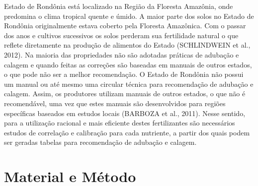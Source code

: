 \documentclass[article,12pt,onesidea,4paper,english,brazil]{abntex2}
\begin{document}
	Estado de Rondônia está localizado na Região da Floresta Amazônia, onde predomina o clima tropical quente e úmido. A maior parte dos solos no Estado de Rondônia originalmente estava coberto pela Floresta Amazônica. Com o passar dos anos e cultivos sucessivos os solos perderam sua fertilidade natural o que reflete diretamente na produção de alimentos do Estado (SCHLINDWEIN et al., 2012).
	Na maioria das propriedades não são adotadas práticas de adubação e calagem e quando feitas as correções são baseadas em manuais de outros estados, o que pode não ser a melhor recomendação. O Estado de Rondônia não possui um manual ou até mesmo uma circular técnica para recomendação de adubação e calagem. Assim, os produtores utilizam manuais de outros estados, o que não é recomendável, uma vez que estes manuais são desenvolvidos para regiões específicas baseados em estudos locais (BARBOZA et al., 2011).
	Nesse sentido, para a utilização racional e mais eficiente destes fertilizantes são necessários estudos de correlação e calibração para cada nutriente, a partir dos quais podem ser geradas tabelas para recomendação de adubação e calagem.
	
	\section*{Material e Método}
	
\end{document}
